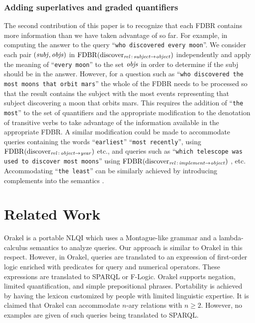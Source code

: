 \documentclass[../main.tex]{subfiles}
\begin{document}
\begin{refsection}
\subsubsection{Adding superlatives and graded quantifiers}
The second contribution of this paper is to recognize that each FDBR contains more information than we
have taken advantage of so far. For example, in computing the answer to the query ``\texttt{who discovered
every moon}''. We consider each pair $(\operatorname{\mathit{subj}}, \operatorname{\mathit{objs}})$ in $\operatorname{FDBR}({\operatorname{discover}_{\operatorname{\mathit{rel}}\,:\,\operatorname{\mathit{subject}} \rightarrow \operatorname{\mathit{object}}}})$
independently and apply the meaning of ``\texttt{every moon}'' to the set $\operatorname{\mathit{objs}}$ in order to determine if the
subj should be in the answer. However, for a question such as ``\texttt{who discovered the most moons that
orbit mars}'' the whole of the FDBR needs to be processed so that the result contains the subject with
the most events representing that subject discovering a moon that orbits mars. This requires the
addition of ``\texttt{the most}'' to the set of quantifiers and the appropriate modification to the denotation of
transitive verbs to take advantage of the information available in the appropriate FDBR. A similar
modification could be made to accommodate queries containing the words ``\texttt{earliest}'' ``\texttt{most recently}'', using $\operatorname{FDBR}({\operatorname{discover}_{\operatorname{\mathit{rel}}\,:\,\operatorname{\mathit{object}} \rightarrow \operatorname{\mathit{year}}}})$ etc., and queries such as ``\texttt{which telescope was used to discover most
moons}'' using $\operatorname{FDBR}({\operatorname{discover}_{\operatorname{\mathit{rel}}\,:\,\operatorname{\mathit{implement}} \rightarrow \operatorname{\mathit{object}}}})$ , etc.  Accommodating ``\texttt{the least}'' can be similarly achieved by introducing complements into the semantics \cite{peelarfrostwebist2020}.

\section{Related Work}
\label{ext:relatedwork}
Orakel \cite{cimiano:haase} is a portable NLQI which uses a Montague-like grammar and a lambda-calculus semantics to analyze queries. Our approach is similar to Orakel in this respect. However, in Orakel, queries are translated to an expression of first-order logic enriched with predicates for query and numerical operators. These expressions are translated to SPARQL or F-Logic. Orakel supports negation, limited quantification, and simple prepositional phrases. Portability is achieved by having the lexicon customized by people with limited linguistic expertise. It is claimed that Orakel can accommodate $n$-ary relations with $n \geq 2$. However, no examples are given of such queries being translated to SPARQL.


\end{refsection}
\end{document}
